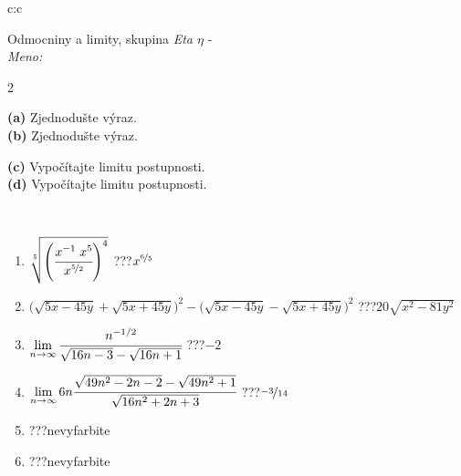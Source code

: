 \documentclass[10pt]{report}
\begin{document}
\begin{tabular}{c:c}
\begin{minipage}[c][104.5mm][t]{0.5\linewidth}
\begin{center}
\vspace{7mm}
{\huge Odmocniny a limity, skupina \textit{Eta $\eta$} -}\\[5mm]
\textit{Meno:}\phantom{xxxxxxxxxxxxxxxxxxxxxxxxxxxxxxxxxxxxxxxxxxxxxxxxxxxxxxxxxxxxxxxxx}\\[5mm]
\begin{minipage}{0.95\linewidth}
\begin{center}
{\small \begin{multicols}{2} \raggedright
\textbf{(a)} Zjednodušte výraz. \\[1mm]
\textbf{(b)} Zjednodušte výraz. \par \columnbreak
\textbf{(c)} Vypočítajte limitu postupnosti. \\[1mm]
\textbf{(d)} Vypočítajte limitu postupnosti.
\end{multicols}
}
\end{center}
\end{minipage}
\\[4mm]
\begin{minipage}{0.79\linewidth}
\begin{center}
\begin{varwidth}{\linewidth}
\begin{enumerate}
\small
\item $\sqrt[5]{\left(\cfrac{x^{-1}\;x^{5}}{x^{\nicefrac{5}{2}}}\right)^{4}}$\quad \dotfill\; ???\;\dotfill \quad $x^{\nicefrac{6}{5}}$
\item {\footnotesize{\scriptsize$\big(\sqrt{5x-45y}+\sqrt{5x+45y}\big)^2-\big(\sqrt{5x-45y}-\sqrt{5x+45y}\big)^2$}\quad \dotfill\; ???\;\dotfill \quad $20\sqrt{x^2-81y^2}$}
\item $\lim\limits_{n\to\infty}\cfrac{n^{-1/2}}{\sqrt{16n-3}-\sqrt{16n+1}}$\quad \dotfill\; ???\;\dotfill \quad $-2$
\item $\lim\limits_{n\to\infty}6n\cfrac{\sqrt{49n^2-2n-2}-\sqrt{49n^2+1}}{\sqrt{16n^2+2n+3}}$\quad \dotfill\; ???\;\dotfill \quad $\nicefrac{-3}{14}$
\item \quad \dotfill\; ???\;\dotfill \quad nevyfarbite
\item \quad \dotfill\; ???\;\dotfill \quad nevyfarbite
\end{enumerate}
\end{varwidth}
\end{center}
\end{minipage}

\end{center}
\end{minipage}
\end{tabular}
\end{document}
